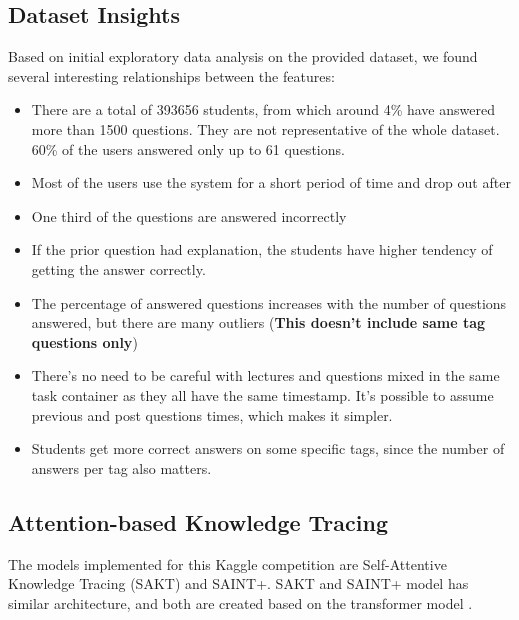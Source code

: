 \documentclass{article}
\begin{document}
\subsection{Dataset Insights}
\label{data_insights}
Based on initial exploratory data analysis on the provided dataset, we found several interesting relationships between the features:
\begin{itemize}
    \item There are a total of 393656 students, from which around 4\% have answered more than 1500 questions. They are not representative of the whole dataset. 60\% of the users answered only up to 61 questions.
    \item Most of the users use the system for a short period of time and drop out after
    \item One third of the questions are answered incorrectly
    \item If the prior question had explanation, the students have higher tendency of getting the answer correctly.
    \item The percentage of answered questions increases with the number of questions answered, but there are many outliers (\textbf{This doesn't include same tag questions only})
    \item There's no need to be careful with lectures and questions mixed in the same task container as they all have the same timestamp. It's possible to assume previous and post questions times, which makes it simpler.
    \item Students get more correct answers on some specific tags, since the number of answers per tag also matters.
\end{itemize}

 
\subsection{Attention-based Knowledge Tracing}
The models implemented for this Kaggle competition are Self-Attentive Knowledge Tracing (SAKT)\cite{Pandey2019} and SAINT+\cite{Choi2020, Shin2020}. SAKT and SAINT+ model has similar architecture, and both are created based on the transformer model \cite{Vaswani2017}.
\end{document}
